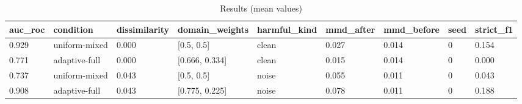 \begin{table}[h]
\centering
\caption{Results (mean values)}
\label{tab:res}
\begin{tabular}{lllllllll}
\toprule
auc\_roc & condition & dissimilarity & domain\_weights & harmful\_kind & mmd\_after & mmd\_before & seed & strict\_f1 \\
\midrule
0.929 & uniform-mixed & 0.000 & [0.5, 0.5] & clean & 0.027 & 0.014 & 0 & 0.154 \\
0.771 & adaptive-full & 0.000 & [0.666, 0.334] & clean & 0.015 & 0.014 & 0 & 0.000 \\
0.737 & uniform-mixed & 0.043 & [0.5, 0.5] & noise & 0.055 & 0.011 & 0 & 0.043 \\
0.908 & adaptive-full & 0.043 & [0.775, 0.225] & noise & 0.078 & 0.011 & 0 & 0.188 \\
\bottomrule
\end{tabular}
\end{table}
